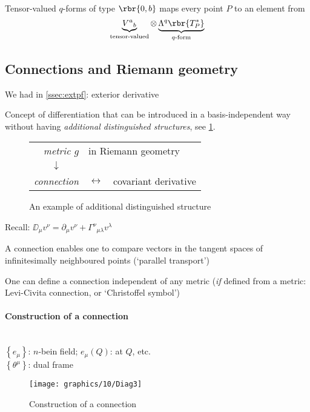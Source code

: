 \begin{defn}
Tensor-valued $q$-forms of type $\rbr{0, b}$ maps every point $P$ to an
element from
\begin{equation}
\underbrace{V^a{}_b}_\text{tensor-valued}\otimes
\underbrace{\Lambda^q\rbr{T_P^*}}_\text{$q$-form}
\end{equation} 
\end{defn}

\subsection{Connections and Riemann geometry}

We had in \cref{ssec:extpf}: exterior derivative

Concept of differentiation that can be introduced in a basis-independent way
without having \emph{additional distinguished structures}, see
\cref{fig:add-dist-struct}.
\begin{figure}
\centering
\begin{tabular}{rcl}
\emph{metric $g$} &\multicolumn{2}{l}{in Riemann geometry} \\
\multicolumn{1}{c}{$\downarrow$} && \\
\emph{connection} & $\leftrightarrow$ & covariant derivative
\end{tabular}
\caption{An example of additional distinguished structure
\label{fig:add-dist-struct}}
\end{figure}

Recall: $\DD_μ v^ν = \partial_μ v^ν + Γ^{ν}{}_{μλ} v^λ$

A connection enables one to compare vectors in the tangent spaces of
infinitesimally neighboured points (`parallel transport')

One can define a connection independent of any metric (\emph{if} defined from
a metric: Levi-Civita connection, or `Christoffel symbol')

\paragraph{Construction of a connection} \mbox{} \\

$\left\{e_μ\right\}$: $n$-bein field; $e_μ(Q)$: at $Q$, etc.\ \\
$\left\{θ^μ\right\}$: dual frame

\begin{figure}
\centering
\texttt{[image: graphics/10/Diag3]}
\caption{Construction of a connection\label{fig:construct-connect}}
\end{figure}

